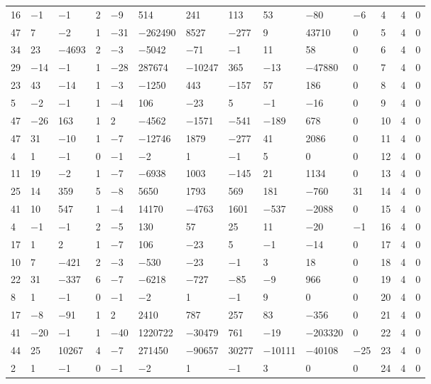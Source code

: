 \documentclass[pdftex]{sigma}
\numberwithin{equation}{section}
\theoremstyle{definition}
\numberwithin{table}{section}
\begin{document}
{\begin{paracol}{3}
\begin{supertabular}{|w{c}{.32cm}w{c}{.32cm}w{c}{.32cm}@{\hspace{.5cm}}w{c}{.2cm}w{c}{.2cm}|@{\hspace{\tabcolsep}}HHHHHHw{c}{.17cm}w{c}{.17cm}w{c}{.17cm}|}
			16 & $-$1 & $-$1 & 2 & $-$9 & 514 & 241 & 113 & 53 & $-$80 & $-$6 & 4 & 4 & 0 \\
			47 & 7 & $-$2 & 1 & $-$31 & $-$262490 & 8527 & $-$277 & 9 & 43710 & 0 & 5 & 4 & 0 \\
			34 & 23 & $-$4693 & 2 & $-$3 & $-$5042 & $-$71 & $-$1 & 11 & 58 & 0 & 6 & 4 & 0 \\
			29 & $-$14 & $-$1 & 1 & $-$28 & 287674 & $-$10247 & 365 & $-$13 & $-$47880 & 0 & 7 & 4 & 0 \\
			23 & 43 & $-$14 & 1 & $-$3 & $-$1250 & 443 & $-$157 & 57 & 186 & 0 & 8 & 4 & 0 \\
			5 & $-$2 & $-$1 & 1 & $-$4 & 106 & $-$23 & 5 & $-$1 & $-$16 & 0 & 9 & 4 & 0 \\
			47 & $-$26 & 163 & 1 & 2 & $-$4562 & $-$1571 & $-$541 & $-$189 & 678 & 0 & 10 & 4 & 0 \\
			47 & 31 & $-$10 & 1 & $-$7 & $-$12746 & 1879 & $-$277 & 41 & 2086 & 0 & 11 & 4 & 0 \\
			4 & 1 & $-$1 & 0 & $-$1 & $-$2 & 1 & $-$1 & 5 & 0 & 0 & 12 & 4 & 0 \\
			11 & 19 & $-$2 & 1 & $-$7 & $-$6938 & 1003 & $-$145 & 21 & 1134 & 0 & 13 & 4 & 0 \\
			25 & 14 & 359 & 5 & $-$8 & 5650 & 1793 & 569 & 181 & $-$760 & 31 & 14 & 4 & 0 \\
			41 & 10 & 547 & 1 & $-$4 & 14170 & $-$4763 & 1601 & $-$537 & $-$2088 & 0 & 15 & 4 & 0 \\
			4 & $-$1 & $-$1 & 2 & $-$5 & 130 & 57 & 25 & 11 & $-$20 & $-$1 & 16 & 4 & 0 \\
			17 & 1 & 2 & 1 & $-$7 & 106 & $-$23 & 5 & $-$1 & $-$14 & 0 & 17 & 4 & 0 \\
			10 & 7 & $-$421 & 2 & $-$3 & $-$530 & $-$23 & $-$1 & 3 & 18 & 0 & 18 & 4 & 0 \\
			22 & 31 & $-$337 & 6 & $-$7 & $-$6218 & $-$727 & $-$85 & $-$9 & 966 & 0 & 19 & 4 & 0 \\
			8 & 1 & $-$1 & 0 & $-$1 & $-$2 & 1 & $-$1 & 9 & 0 & 0 & 20 & 4 & 0 \\
			17 & $-$8 & $-$91 & 1 & 2 & 2410 & 787 & 257 & 83 & $-$356 & 0 & 21 & 4 & 0 \\
			41 & $-$20 & $-$1 & 1 & $-$40 & 1220722 & $-$30479 & 761 & $-$19 & $-$203320 & 0 & 22 & 4 & 0 \\
			44 & 25 & 10267 & 4 & $-$7 & 271450 & $-$90657 & 30277 & $-$10111 & $-$40108 & $-$25 & 23 & 4 & 0 \\
			2 & 1 & $-$1 & 0 & $-$1 & $-$2 & 1 & $-$1 & 3 & 0 & 0 & 24 & 4 & 0 \\

\end{supertabular}
\end{paracol}}
\end{document}
